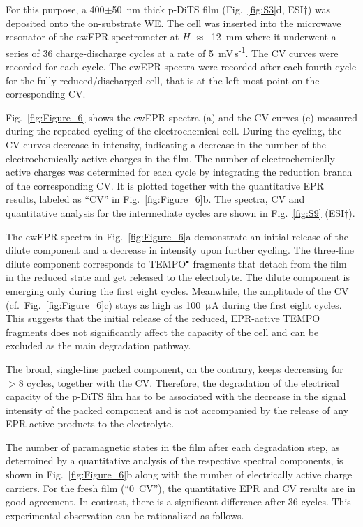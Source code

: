 \par
For this purpose, a 400$\pm$50~nm thick p-DiTS film (Fig.~\ref{fig:S3}d, ESI$\dag$) was deposited onto the on-substrate WE. The cell was inserted into the microwave resonator of the cwEPR spectrometer at $H$ $\approx$~12~mm where it underwent a series of 36 charge-discharge cycles at a rate of 5~mV\,s\textsuperscript{-1}. The CV curves were recorded for each cycle. The cwEPR spectra were recorded after each fourth cycle for the fully reduced/discharged cell, that is at the left-most point on the corresponding CV.

\par
Fig.~\ref{fig:Figure_6} shows the cwEPR spectra (a) and the CV curves (c) measured during the repeated cycling of the electrochemical cell. During the cycling, the CV curves decrease in intensity, indicating a decrease in the number of the electrochemically active charges in the film. The number of electrochemically active charges was determined for each cycle by integrating the reduction branch of the corresponding CV. It is plotted together with the quantitative EPR results, labeled as ``CV'' in Fig.~\ref{fig:Figure_6}b. The spectra, CV and quantitative analysis for the intermediate cycles are shown in Fig.~\ref{fig:S9} (ESI$\dag$).

\par
The cwEPR spectra in Fig.~\ref{fig:Figure_6}a demonstrate an initial release of the dilute component and a decrease in intensity upon further cycling. The three-line dilute component corresponds to TEMPO$^{\bullet}$ fragments that detach from the film in the reduced state and get released to the electrolyte. The dilute component is emerging only during the first eight cycles. Meanwhile, the amplitude of the CV (cf.\ Fig.~\ref{fig:Figure_6}c) stays as high as 100~$\muup$A during the first eight cycles. This suggests that the initial release of the reduced, EPR-active TEMPO fragments does not significantly affect the capacity of the cell and can be excluded as the main degradation pathway.

\par
The broad, single-line packed component, on the contrary, keeps decreasing for $>$8 cycles, together with the CV. Therefore, the degradation of the electrical capacity of the p-DiTS film has to be associated with the decrease in the signal intensity of the packed component and is not accompanied by the release of any EPR-active products to the electrolyte.

\par
The number of paramagnetic states in the film after each degradation step, as determined by a quantitative analysis of the respective spectral components, is shown in Fig.~\ref{fig:Figure_6}b along with the number of electrically active charge carriers. For the fresh film (``0~CV''), the quantitative EPR and CV results are in good agreement. In contrast, there is a significant difference after 36 cycles. This experimental observation can be rationalized as follows.

